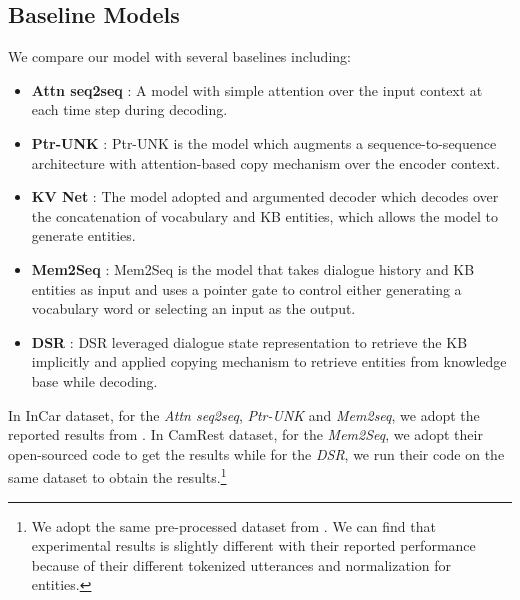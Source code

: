 \documentclass[11pt,a4paper]{article}
\begin{document}
 \subsection{Baseline Models}
 We compare our model with several baselines including:
 \begin{itemize}
 	\item \textbf{Attn seq2seq}  \cite{luong-etal-2015-effective}:
 	 A model with simple attention over the input context at each time step during decoding.
 	 	\item \textbf{Ptr-UNK}  \cite{P16-1014}:
 	 Ptr-UNK is the model which augments a sequence-to-sequence architecture with attention-based copy mechanism over the encoder context.
 	 

 	\item \textbf{KV Net}  \cite{eric:2017:SIGDial}:
     The model adopted and
 	argumented decoder which decodes
 	over the concatenation of vocabulary and KB entities,
 	which allows the model to generate entities.
 	\item \textbf{Mem2Seq} \cite{madotto2018mem2seq}:
 	Mem2Seq is the model that takes dialogue history and KB entities
 	as input and uses a pointer gate
 	to control either generating a vocabulary word or selecting 
 	an input as the output.
 	\item \textbf{DSR} \cite{wen2018sequence}:  DSR leveraged dialogue state representation to retrieve the KB implicitly and  applied copying mechanism to retrieve entities from knowledge base while decoding.

 \end{itemize}
 In InCar dataset, 
  for the \textit{Attn seq2seq},  \textit{Ptr-UNK} and \textit{Mem2seq}, we adopt the reported results from .
  In CamRest dataset, for the \textit{Mem2Seq}, we adopt their open-sourced code
  to get the results while for the \textit{DSR}, we run their code on the same dataset to obtain the results.\footnote{We adopt the same pre-processed dataset from . We can find that experimental results is slightly different with their reported performance \cite{wen2018sequence} because of their different tokenized utterances and normalization for entities.}
  
\end{document}
